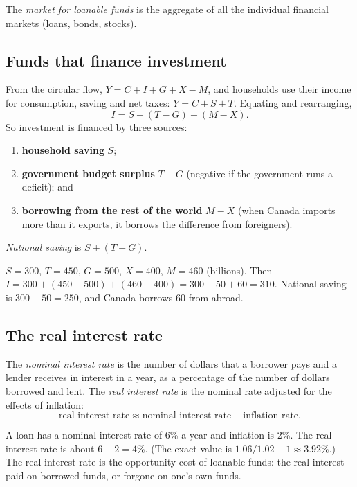 \begin{definition}
The \emph{market for loanable funds} is the aggregate of all the individual financial
markets (loans, bonds, stocks).
\end{definition}

\subsection{Funds that finance investment}

From the circular flow, $Y = C + I + G + X - M$, and households use their income for
consumption, saving and net taxes: $Y = C + S + T$. Equating and rearranging,
\[
  \boxed{I = S + (T - G) + (M - X).}
\]
So investment is financed by three sources:
\begin{enumerate}
  \item \textbf{household saving} $S$;
  \item \textbf{government budget surplus} $T - G$ (negative if the government runs a
        deficit); and
  \item \textbf{borrowing from the rest of the world} $M - X$ (when Canada imports more
        than it exports, it borrows the difference from foreigners).
\end{enumerate}
\emph{National saving} is $S + (T - G)$.

\begin{example}
$S = 300$, $T = 450$, $G = 500$, $X = 400$, $M = 460$ (billions). Then
$I = 300 + (450 - 500) + (460 - 400) = 300 - 50 + 60 = 310$. National saving is
$300 - 50 = 250$, and Canada borrows 60 from abroad.
\end{example}

\subsection{The real interest rate}

\begin{definition}
The \emph{nominal interest rate} is the number of dollars that a borrower pays and a
lender receives in interest in a year, as a percentage of the number of dollars borrowed
and lent. The \emph{real interest rate} is the nominal rate adjusted for the effects of
inflation:
\[
  \text{real interest rate} \approx \text{nominal interest rate} - \text{inflation rate}.
\]
\end{definition}

\begin{example}
A loan has a nominal interest rate of 6\% a year and inflation is 2\%. The real interest
rate is about $6 - 2 = 4\%$. (The exact value is $1.06/1.02 - 1 \approx 3.92\%$.) The real
interest rate is the opportunity cost of loanable funds: the real interest paid on
borrowed funds, or forgone on one's own funds.
\end{example}

